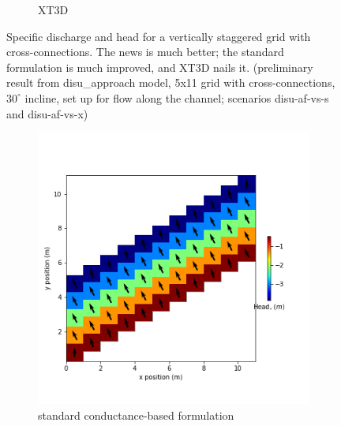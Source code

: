 \documentclass{article}
\begin{document}
\begin{figure}[H]
\begin{subfigure}{0.4\textwidth}
	\caption{XT3D}
	\label{fig:disu-x-cc-head}
\end{subfigure}
\caption{Specific discharge and head for a vertically staggered grid with cross-connections. The news is much better; the standard formulation is much improved, and XT3D nails it. (preliminary result from disu\_approach model, 5x11 grid with cross-connections, $30^{\circ}$ incline, set up for flow along the channel; scenarios disu-af-vs-s and disu-af-vs-x)}
\label{fig:figures}
\end{figure}

\begin{figure}[H]
\centering
\begin{subfigure}{0.4\textwidth}
	\includegraphics[width=\textwidth]{../figures/disu-cf-vs-s-head.png}
	\caption{standard conductance-based formulation}
	\label{fig:disu-s-cc-cf-head}
\end{subfigure}
\hfill
\begin{subfigure}{0.4\textwidth}

\end{subfigure}
\end{figure}
\end{document}
